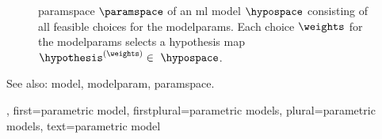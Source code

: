 {{\begin{figure}[H]
\begin{center}
			\end{center} 
		\caption{\Gls{paramspace} $\paramspace$ of an \gls{ml} \gls{model} $\hypospace$ consisting of all 
			feasible choices for the \glspl{modelparam}. Each choice $\weights$ for the \glspl{modelparam} 
			selects a \gls{hypothesis} \gls{map} $\hypothesis^{(\weights)} \in \hypospace$.
			\label{fig_param_model_dict}} 
		\end{figure}
		See also: \gls{model}, \gls{modelparam}, \gls{paramspace}.},
	first={parametric model},
	firstplural={parametric models},
	plural={parametric models},
	text={parametric model}
}

